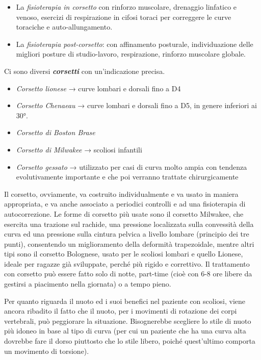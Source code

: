 \documentclass[]{article}
\begin{document}
\begin{itemize}
\item
  La \emph{fisioterapia in corsetto} con rinforzo muscolare, drenaggio
  linfatico e venoso, esercizi di respirazione in cifosi toraci per
  correggere le curve toraciche e auto-allungamento.
\item
  La \emph{fisioterapia post-corsetto}: con affinamento posturale,
  individuazione delle migliori posture di studio-lavoro, respirazione,
  rinforzo muscolare globale.
\end{itemize}

Ci sono diversi \textbf{\emph{corsetti}} con un'indicazione precisa.

\begin{itemize}
\item
  \emph{Corsetto lionese} → curve lombari e dorsali fino a D4
\end{itemize}

\begin{itemize}
\item
  \emph{Corsetto Chenaeau} → curve lombari e dorsali fino a D5, in
  genere inferiori ai 30°.
\item
  \emph{Corsetto di Boston Brase}
\item
  \emph{Corsetto di Milwakee} → scoliosi infantili
\item
  \emph{Corsetto gessato} → utilizzato per casi di curva molto ampia con
  tendenza evolutivamente importante e che poi verranno trattate
  chirurgicamente
\end{itemize}

Il corsetto, ovviamente, va costruito individualmente e va usato in
maniera appropriata, e va anche associato a periodici controlli e ad una
fisioterapia di autocorrezione. Le forme di corsetto più usate sono il
corsetto Milwakee, che esercita una trazione sul rachide, una pressione
localizzata sulla convessità della curva ed una pressione sulla cintura
pelvica a livello lombare (principio dei tre punti), consentendo un
miglioramento della deformità trapezoidale, mentre altri tipi sono il
corsetto Bolognese, usato per le scoliosi lombari e quello Lionese,
ideale per ragazze già sviluppate, perché più rigido e correttivo. Il
trattamento con corsetto può essere fatto solo di notte, part-time (cioè
con 6-8 ore libere da gestirsi a piacimento nella giornata) o a tempo
pieno.

Per quanto riguarda il nuoto ed i suoi benefici nel paziente con
scoliosi, viene ancora ribadito il fatto che il nuoto, per i movimenti
di rotazione dei corpi vertebrali, può peggiorare la situazione.
Bisognerebbe scegliere lo stile di nuoto più idoneo in base al tipo di
curva (per cui un paziente che ha una curva alta dovrebbe fare il dorso
piuttosto che lo stile libero, poiché quest'ultimo comporta un movimento
di torsione).
\end{document}

